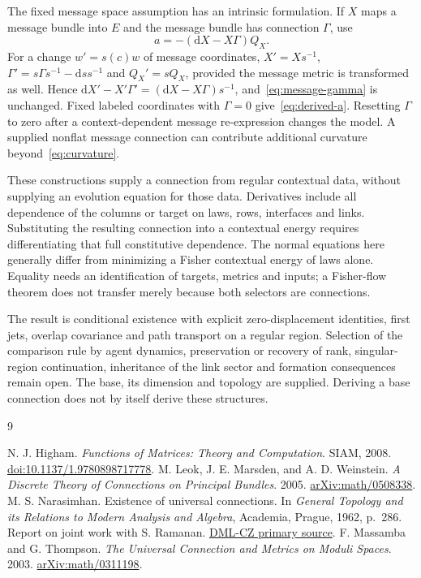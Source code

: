 \documentclass[11pt]{article}
\newcommand{\dd}{\mathrm d}
\begin{document}
The fixed message space assumption has an intrinsic formulation. If $X$ maps a message bundle into $E$ and the message bundle has connection $\Gamma$, use
\begin{equation}
 a=-(\dd X-X\Gamma)Q_X.
 \label{eq:message-gamma}
\end{equation}
For a change $w'=s(c)w$ of message coordinates, $X'=Xs^{-1}$, $\Gamma'=s\Gamma s^{-1}-\dd s s^{-1}$ and $Q_X'=sQ_X$, provided the message metric is transformed as well. Hence $\dd X'-X'\Gamma'=(\dd X-X\Gamma)s^{-1}$, and~\eqref{eq:message-gamma} is unchanged. Fixed labeled coordinates with $\Gamma=0$ give~\eqref{eq:derived-a}. Resetting $\Gamma$ to zero after a context-dependent message re-expression changes the model. A supplied nonflat message connection can contribute additional curvature beyond~\eqref{eq:curvature}.

These constructions supply a connection from regular contextual data, without supplying an evolution equation for those data. Derivatives include all dependence of the columns or target on laws, rows, interfaces and links. Substituting the resulting connection into a contextual energy requires differentiating that full constitutive dependence. The normal equations here generally differ from minimizing a Fisher contextual energy of laws alone. Equality needs an identification of targets, metrics and inputs; a Fisher-flow theorem does not transfer merely because both selectors are connections.

The result is conditional existence with explicit zero-displacement identities, first jets, overlap covariance and path transport on a regular region. Selection of the comparison rule by agent dynamics, preservation or recovery of rank, singular-region continuation, inheritance of the link sector and formation consequences remain open. The base, its dimension and topology are supplied. Deriving a base connection does not by itself derive these structures.

\clearpage
\begingroup
\small
\begin{thebibliography}{9}
\raggedright
\setlength{\itemsep}{2pt}
N. J. Higham. \emph{Functions of Matrices: Theory and Computation}. SIAM, 2008.
\href{https://doi.org/10.1137/1.9780898717778}{doi:10.1137/1.9780898717778}.
M. Leok, J. E. Marsden, and A. D. Weinstein.
\emph{A Discrete Theory of Connections on Principal Bundles}. 2005.
\href{https://arxiv.org/abs/math/0508338}{arXiv:math/0508338}.
M. S. Narasimhan. Existence of universal connections.
In \emph{General Topology and its Relations to Modern Analysis and Algebra},
Academia, Prague, 1962, p.~286. Report on joint work with S. Ramanan.
\href{https://dml.cz/handle/10338.dmlcz/700905}{DML-CZ primary source}.
F. Massamba and G. Thompson. \emph{The Universal Connection and Metrics on Moduli Spaces}. 2003.
\href{https://arxiv.org/abs/math/0311198}{arXiv:math/0311198}.
\end{thebibliography}
\endgroup
\end{document}
